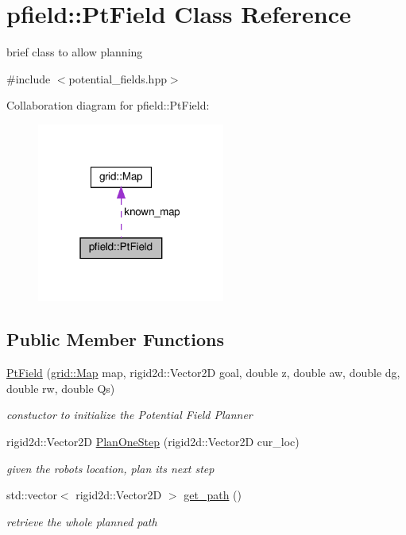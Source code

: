 \hypertarget{classpfield_1_1PtField}{}\section{pfield\+:\+:Pt\+Field Class Reference}
\label{classpfield_1_1PtField}


brief class to allow planning  




{\ttfamily \#include $<$potential\+\_\+fields.\+hpp$>$}



Collaboration diagram for pfield\+:\+:Pt\+Field\+:\nopagebreak
\begin{figure}[H]
\begin{center}
\leavevmode
\includegraphics[width=175pt]{df/d59/classpfield_1_1PtField__coll__graph}
\end{center}
\end{figure}
\subsection*{Public Member Functions}
\begin{DoxyCompactItemize}
\item 
\hyperlink{classpfield_1_1PtField_aee7dcc713ac6d16364e8bebe2da64681}{Pt\+Field} (\hyperlink{structgrid_1_1Map}{grid\+::\+Map} map, rigid2d\+::\+Vector2D goal, double z, double aw, double dg, double rw, double Qs)
\begin{DoxyCompactList}\small\item\em constuctor to initialize the Potential Field Planner \end{DoxyCompactList}\item 
rigid2d\+::\+Vector2D \hyperlink{classpfield_1_1PtField_af1faea5a1127d6df5e06727391227ade}{Plan\+One\+Step} (rigid2d\+::\+Vector2D cur\+\_\+loc)
\begin{DoxyCompactList}\small\item\em given the robots location, plan its next step \end{DoxyCompactList}\item 
std\+::vector$<$ rigid2d\+::\+Vector2D $>$ \hyperlink{classpfield_1_1PtField_ab936f2bf686f45a2a11825e5a8911356}{get\+\_\+path} ()
\begin{DoxyCompactList}\small\item\em retrieve the whole planned path \end{DoxyCompactList}\end{DoxyCompactItemize}
